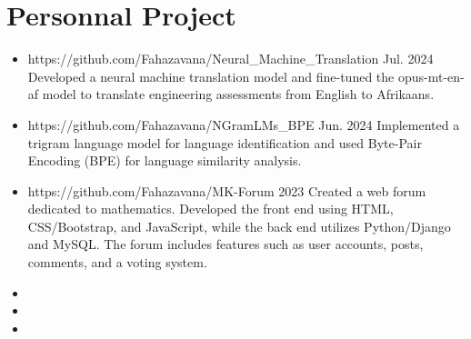\documentclass[a4paper, oneside, 10pt]{article}
\begin{document}
\section{Personnal Project}
\begin{itemize}
\item[\faCode]
{https://github.com/Fahazavana/Neural_Machine_Translation}
{Jul. 2024}  %
{Developed a neural machine translation model and fine-tuned the opus-mt-en-af model to translate engineering assessments from English to Afrikaans.}

\item[\faCode] %
{https://github.com/Fahazavana/NGramLMs_BPE}%
{Jun. 2024}%
{Implemented a trigram language model for language identification and used Byte-Pair Encoding (BPE) for language similarity analysis.}

\item[\faCode] %
{https://github.com/Fahazavana/MK-Forum}%
{2023}%
{Created a web forum dedicated to mathematics. Developed the front end using HTML, CSS/Bootstrap, and JavaScript, while the back end utilizes Python/Django and MySQL. The forum includes features such as user accounts, posts, comments, and a voting system.}
%

\item[\faGamepad] 

\item[\faGamepad] 

\item[\faCode] 
\end{itemize}
\end{document}
